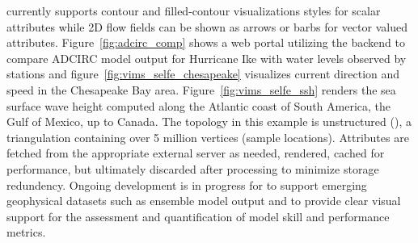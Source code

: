 \sciwms{} currently supports contour and filled-contour visualizations
styles for scalar attributes while 2D flow fields can be shown as
arrows or barbs for vector valued
attributes. Figure~\ref{fig:adcirc_comp} shows a web portal utilizing
the \sciwms{} backend to compare ADCIRC model output for Hurricane Ike
with water levels observed by \noaa{} stations and
figure~\ref{fig:vims_selfe_chesapeake} visualizes current direction
and speed in the Chesapeake Bay area. Figure~\ref{fig:vims_selfe_ssh}
renders the sea surface wave height computed along the Atlantic coast
of South America, the Gulf of Mexico, up to Canada. The topology in
this example is unstructured (\ugrid{}), a triangulation containing
over 5 million vertices (sample locations). Attributes are fetched
from the appropriate external server as needed, rendered, cached for
performance, but ultimately discarded after processing to minimize
storage redundency. Ongoing development is in progress for \sciwms{}
to support emerging geophysical datasets such as ensemble model output
and to provide clear visual support for the assessment and
quantification of model skill and performance metrics.
\newif\ifpltsub
\ifpltsub
